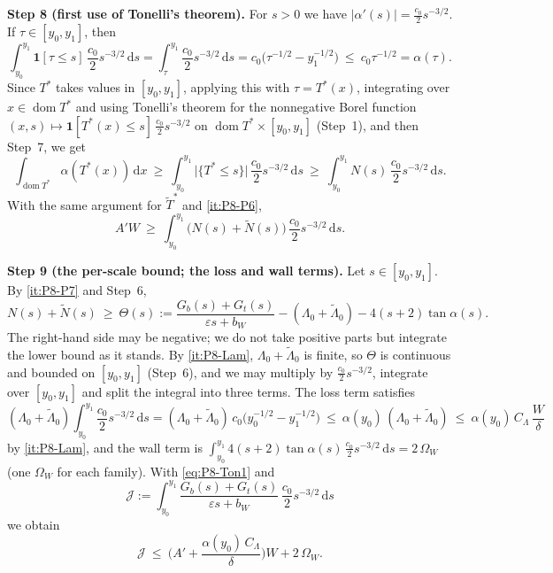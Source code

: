 \documentclass[11pt]{amsart}
\newcommand{\eps}{\varepsilon}
\newcommand{\Lam}{\Lambda}
\newcommand{\Tstar}{T^{*}}
\newcommand{\dd}{\,\mathrm d}
\theoremstyle{definition}
\theoremstyle{remark}
\numberwithin{equation}{section}
\begin{document}
\medskip\noindent\textbf{Step 8 (first use of Tonelli's theorem).}
For $s>0$ we have $|\alpha'(s)|=\frac{c_0}{2}s^{-3/2}$. If $\tau\in[y_0,y_1]$, then
\[
\int_{y_0}^{y_1}\mathbf 1[\tau\le s]\,\frac{c_0}{2}s^{-3/2}\dd s=\int_{\tau}^{y_1}\frac{c_0}{2}s^{-3/2}\dd s
=c_0\big(\tau^{-1/2}-y_1^{-1/2}\big)\ \le\ c_0\tau^{-1/2}=\alpha(\tau).
\]
Since $\Tstar$ takes values in $[y_0,y_1]$, applying this with $\tau=\Tstar(x)$, integrating over
$x\in\operatorname{dom}\Tstar$ and using Tonelli's theorem for the nonnegative Borel function
$(x,s)\mapsto\mathbf 1[\Tstar(x)\le s]\,\frac{c_0}2s^{-3/2}$ on $\operatorname{dom}\Tstar\times[y_0,y_1]$ (Step~1), and then
Step~7, we get
\[
\int_{\operatorname{dom}\Tstar}\alpha(\Tstar(x))\dd x\ \ge\ \int_{y_0}^{y_1}\big|\{\Tstar\le s\}\big|\,\frac{c_0}2s^{-3/2}\dd s
\ \ge\ \int_{y_0}^{y_1}N(s)\,\frac{c_0}2s^{-3/2}\dd s .
\]
With the same argument for $\tilde T^*$ and \ref{it:P8-P6},
\begin{equation}\label{eq:P8-Ton1}
A'W\ \ge\ \int_{y_0}^{y_1}\big(N(s)+\tilde N(s)\big)\,\frac{c_0}{2}s^{-3/2}\dd s .
\end{equation}

\medskip\noindent\textbf{Step 9 (the per-scale bound; the loss and wall terms).}
Let $s\in[y_0,y_1]$. By \ref{it:P8-P7} and Step~6,
\[
N(s)+\tilde N(s)\ \ge\ \Theta(s):=\frac{G_b(s)+G_t(s)}{\eps s+b_W}-(\Lam_0+\tilde\Lam_0)-4(s+2)\tan\alpha(s) .
\]
The right-hand side may be negative; we do not take positive parts but integrate the lower bound as it stands. By
\ref{it:P8-Lam}, $\Lam_0+\tilde\Lam_0$ is finite, so $\Theta$ is continuous and bounded on $[y_0,y_1]$ (Step~6), and we may
multiply by $\frac{c_0}2s^{-3/2}$, integrate over $[y_0,y_1]$ and split the integral into three terms. The loss term
satisfies
\[
(\Lam_0+\tilde\Lam_0)\int_{y_0}^{y_1}\frac{c_0}{2}s^{-3/2}\dd s=(\Lam_0+\tilde\Lam_0)\,c_0\big(y_0^{-1/2}-y_1^{-1/2}\big)
\ \le\ \alpha(y_0)\,(\Lam_0+\tilde\Lam_0)\ \le\ \alpha(y_0)\,C_\Lam\,\frac{W}{\delta}
\]
by \ref{it:P8-Lam}, and the wall term is
$\int_{y_0}^{y_1}4(s+2)\tan\alpha(s)\,\frac{c_0}2s^{-3/2}\dd s=2\,\Omega_W$ (one $\Omega_W$ for each family). With
\eqref{eq:P8-Ton1} and
\[
\mathcal J:=\int_{y_0}^{y_1}\frac{G_b(s)+G_t(s)}{\eps s+b_W}\,\frac{c_0}{2}s^{-3/2}\dd s
\]
we obtain
\begin{equation}\label{eq:P8-J}
\mathcal J\ \le\ \Big(A'+\frac{\alpha(y_0)\,C_\Lam}{\delta}\Big)W+2\,\Omega_W .
\end{equation}
\end{document}
